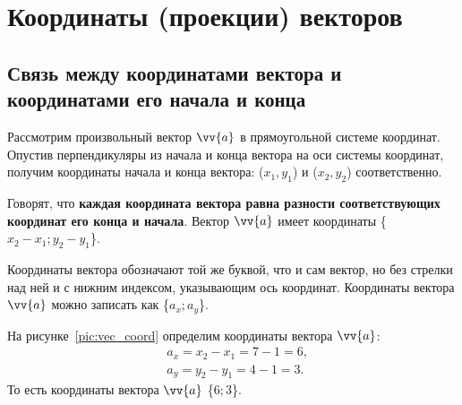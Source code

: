 \section{Координаты (проекции) векторов}

\subsection{Связь между координатами вектора и координатами
его начала и конца}
Рассмотрим произвольный вектор $\vv{a}$ в прямоугольной системе координат.
Опустив перпендикуляры из начала и конца вектора на оси системы координат,
получим координаты начала и конца вектора: ($x_1, y_1$) и ($x_2, y_2$)
соответственно.

Говорят, что \textbf{каждая координата вектора равна разности соответствующих
координат его конца и начала}.
Вектор $\vv{a}$ имеет координаты {\large\{$x_2-x_1; y_2-y_1$\}}.

Координаты вектора обозначают той же буквой, что и сам вектор, но без стрелки над ней
и с нижним индексом, указывающим ось координат. Координаты вектора $\vv{a}$ можно записать
как {\large\{$a_x; a_y$\}}.

На рисунке~\ref{pic:vec_coord} определим координаты вектора $\vv{a}$:
\begin{align*}
  &a_x = x_2-x_1 = 7 -1 = 6,\\
  &a_y = y_2-y_1 = 4-1=3.
\end{align*}
То есть координаты вектора $\vv{a}$ \{$6; 3$\}.

